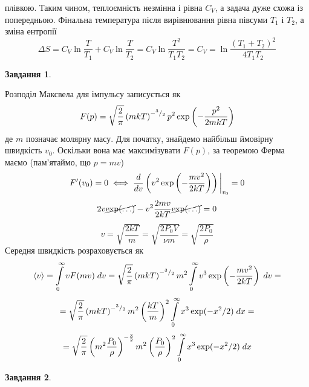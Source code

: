 \documentclass[12pt]{article} %
\newtheorem{prob}{Завдання}
\newcommand{\dx}{\;dx}
\newcommand{\dv}{\;dv}
\let\oldint\int
\renewcommand{\int}{\oldint\limits}
\begin{document}
	плівкою. Таким чином, теплоємність незмінна і рівна $C_V$, а задача дуже схожа із попередньою. Фінальна температура після вирівнювання
	рівна півсуми $T_1$ і $T_2$, а зміна ентропії
	\[\Delta S=C_V\ln\frac{T}{T_1}+C_V\ln\frac{T}{T_2}=C_V\ln\frac{T^2}{T_1T_2}=C_V=\ln\frac{(T_1+T_2)^2}{4T_1T_2}\]
\setcounter{prob}{0}
\begin{prob}\end{prob}%
	Розподіл Максвела для імпульсу записується як
	\[F(p)=\sqrt{\frac{2}{\pi}}\left(mkT\right)^{-{^{3}/_{2}}}p^2\exp\left(-\frac{p^2}{2mkT}\right)\]
	де $m$ позначає молярну масу. Для початку, знайдемо найбільш ймовірну швидкість $v_0$. Оскільки вона має максимізувати $F(p)$, за
	теоремою Ферма маємо (пам’ятаймо, що $p=mv$)
	\[F'(v_0)=0\iff \frac{d}{dv}\left(v^2\exp\left(-\frac{mv^2}{2kT}\right)\right)\bigg|_{v_0}=0\]
	\[2v\cancel{\exp(\hdots)}-v^2\frac{2mv}{2kT}\cancel{\exp(\hdots)}=0\]
	\[v=\sqrt{\frac{2kT}{m}}=\sqrt{\frac{2P_0V}{\nu m}}=\sqrt{\frac{2P_0}{\rho}}\]
	Середня швидкість розраховується як
	\[\myabra{v}=\int_0^{\infty}vF(mv)\dv=\sqrt{\frac{2}{\pi}}\mybra{mkT}^{-\myfrac{3}{2}}m^2\int_0^\infty v^3\exp\mybra{-\frac{mv^2}{2kT}}\dv=\]
	\[=\sqrt{\frac{2}{\pi}}\mybra{mkT}^{-\myfrac{3}{2}}{m^2}\mybra{\frac{kT}{{m}}}^2\int_0^\infty x^3\exp(-x^2/2)\dx=\]
	\[=\sqrt{\frac{2}{\pi}}\mybra{m^2\frac{P_0}{\rho}}^{-\frac{3}{2}}m^2\mybra{\frac{P_0}{\rho}}^2\int_0^\infty x^3\exp(-x^2/2)\dx\]
\begin{prob}\end{prob}%
\end{document}

